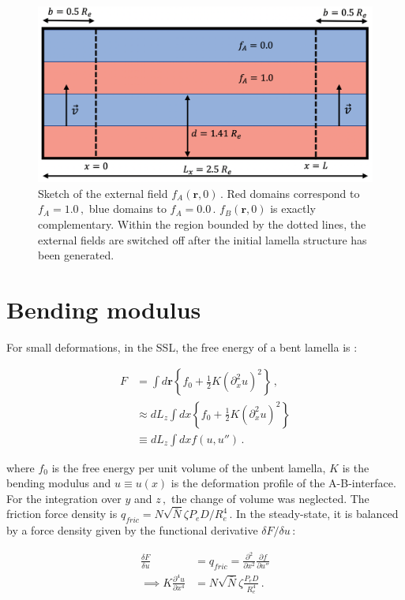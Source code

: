 \documentclass[bachelor,       %
               twoside,        %
               BCOR10mm,       %
               ngerman, english %
               ]{GAUBM}
\begin{document}
\begin{figure}[h]
    \centering
    \includegraphics[width=0.6\linewidth]{figures/fext.png}
    \caption{Sketch of the external field $f_A(\mathbf r,0)\,.$ Red domains correspond to $f_A=1.0\,,$ blue domains to $f_A=0.0\,.$ $f_B(\mathbf r,0)$ is exactly complementary. Within the region bounded by the dotted lines, the external fields are switched off after the initial lamella structure has been generated.}
    \label{fig:fext}
\end{figure}


\section{Bending modulus}


For small deformations, in the \ac{SSL}, the free energy of a bent lamella is \cite{wang94}:

\begin{align}
    F&=\int d\mathbf r\left\{f_0+\frac{1}{2}K \left(\partial_x^2 u\right)^2\right\}\,,\\
    &\approx dL_z\int dx\left\{f_0+\frac{1}{2}K \left(\partial_x^2 u\right)^2\right\}\nonumber\\
    &\equiv dL_z\int dxf(u,u'')\,.
    \label{eq:F_bend}
\end{align}

where $f_0$ is the free energy per unit volume of the unbent lamella, $K$ is the bending modulus and $u\equiv u(x)$ is the deformation profile of the A-B-interface. For the integration over $y$ and $z\,,$ the change of volume was neglected. The friction force density is $q_{fric}=N\sqrt{\bar N}\zeta P_eD/R_e^4\,.$ In the steady-state, it is balanced by a force density given by the  functional derivative $\delta F/\delta u\,$:

\begin{align}
    \frac{\delta F}{\delta u}&=q_{fric}=\frac{\partial^2}{\partial x^2}\frac{\partial f}{\partial u''} \nonumber \\
    \implies K\frac{\partial^4u}{\partial x^4}&=N\sqrt{\bar N}\zeta\frac{P_eD}{R_e^4} \,.
\end{align}
\end{document}
